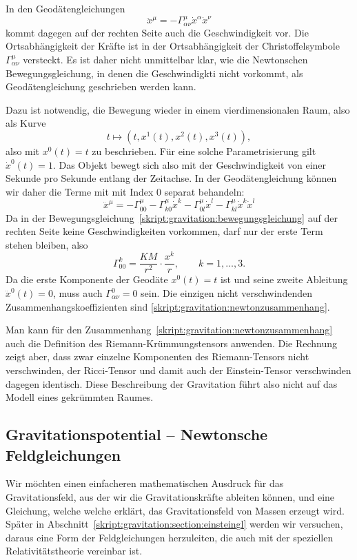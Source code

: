 In den Geodätengleichungen 
\[
\ddot x^\mu = -\Gamma^\mu_{\alpha\nu}\dot x^\alpha\dot x^\nu
\]
kommt dagegen auf der rechten Seite auch die Geschwindigkeit vor.
Die Ortsabhängigkeit der Kräfte ist in der Ortsabhängigkeit der
Christoffelsymbole $\Gamma^\mu_{\alpha\nu}$ versteckt.
Es ist daher nicht unmittelbar klar, wie die Newtonschen Bewegungsgleichung,
in denen die Geschwindigkti nicht vorkommt, als Geodätengleichung geschrieben
werden kann.

Dazu ist notwendig, die Bewegung wieder in einem vierdimensionalen Raum,
also als Kurve
\[
t\mapsto (t,x^1(t),x^2(t),x^3(t)),
\]
also mit $x^0(t)=t$ zu beschrieben.
Für eine solche Parametrisierung gilt $\dot x^0(t)=1$.
Das Objekt bewegt sich also mit der Geschwindigkeit von einer Sekunde pro
Sekunde entlang der Zeitachse.
In der Geodätengleichung können wir daher die Terme mit mit Index $0$
separat behandeln:
\[
\ddot x^\mu
=
-\Gamma^\mu_{00}
-\Gamma^\mu_{k0}\dot x^k -\Gamma^\mu_{0l}\dot x^l
- \Gamma^\mu_{kl}\dot x^k\dot x^l
\]
Da in der Bewegungsgleichung~\eqref{skript:gravitation:bewegungsgleichung}
auf der rechten Seite keine Geschwindigkeiten vorkommen, darf nur der
erste Term stehen bleiben, also
\begin{equation}
\Gamma^k_{00} = \frac{KM}{r^2}\cdot \frac{x^k}{r},\qquad k=1,\dots,3.
\label{skript:gravitation:newtonzusammenhang}
\end{equation}
Da die erste Komponente der Geodäte $x^0(t)=t$ ist und seine zweite
Ableitung $\ddot x^0(t)=0$, muss auch $\Gamma^0_{\alpha\nu}=0$ sein.
Die einzigen nicht verschwindenden Zusammenhangskoeffizienten sind
\eqref{skript:gravitation:newtonzusammenhang}.

Man kann für den Zusammenhang~\eqref{skript:gravitation:newtonzusammenhang}
auch die Definition des Riemann-Krümmungstensors anwenden.
Die Rechnung zeigt aber, dass zwar einzelne Komponenten des Riemann-Tensors
nicht verschwinden, der Ricci-Tensor und damit auch der Einstein-Tensor
verschwinden dagegen identisch.
Diese Beschreibung der Gravitation führt also nicht auf das Modell
eines gekrümmten Raumes.

\subsection{Gravitationspotential -- Newtonsche Feldgleichungen}
Wir möchten einen einfacheren mathematischen Ausdruck für das Gravitationsfeld,
aus der wir die Gravitationskräfte ableiten können, und eine Gleichung,
welche welche erklärt, das Gravitationsfeld von Massen erzeugt wird.
Später in Abschnitt~\ref{skript:gravitation:section:einsteingl}
werden wir versuchen, daraus eine Form der Feldgleichungen herzuleiten,
die auch mit der speziellen Relativitätstheorie vereinbar ist.

